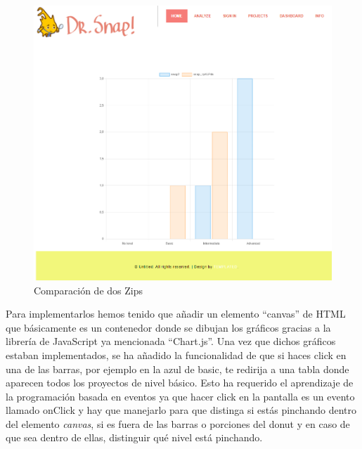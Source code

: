 \documentclass[a4paper, 12pt]{book}
\begin{document}
\begin{itemize}
         \begin{figure}[h]
            \centering
            \includegraphics[scale=0.4]{img/comparar.PNG}
            \caption{Comparación de dos Zips}
            \label{figura:dshboard}
        \end{figure}
       
    \end{itemize}
    Para implementarlos hemos tenido que añadir un elemento ``canvas'' de HTML que básicamente es un contenedor donde se dibujan los gráficos gracias a la librería de JavaScript ya mencionada ``Chart.js''. Una vez que dichos gráficos estaban implementados, se ha añadido la funcionalidad de que si haces click en una de las barras, por ejemplo en la azul de basic, te redirija a una tabla donde aparecen todos los proyectos de nivel básico. Esto ha requerido el aprendizaje de la programación basada en eventos ya que hacer click en la pantalla es un evento llamado onClick y hay que manejarlo para que distinga si estás pinchando dentro del elemento \textit{canvas}, si es fuera de las barras o porciones del donut y en caso de que sea dentro de ellas, distinguir qué nivel está pinchando.




\end{document}
